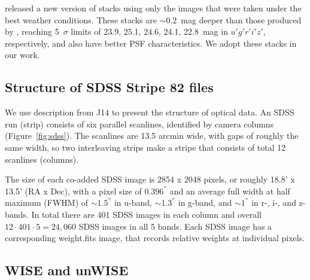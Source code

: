 \documentclass[apj,iop]{emulateapj}
\begin{document}
\citet[][hereafter J14]{Jiang2014} released a new version of stacks using only the images that were taken under the best weather conditions. These stacks are $\sim0.2$~mag deeper than those produced by \citet[][]{Annis2014}, reaching 5~$\sigma$ limits of 23.9, 25.1, 24.6, 24.1, 22.8~mag in $u' g' r' i' z'$, respectively, and also have better PSF characteristics. We adopt these stacks in our work.

\subsection{Structure of SDSS Stripe 82 files}

We use description from J14 to present the structure of optical data. An SDSS run (strip) consists of six parallel scanlines, identified by camera columns (Figure~\ref{fig:sdss}). The scanlines are 13.5 arcmin wide, with gaps of roughly the same width, so two interleaving strips make a stripe that consists of total 12 scanlines (columns). 


The size of each co-added SDSS image is 2854 x 2048 pixels, or roughly 18.8' x 13.5' (RA x Dec), with a pixel size of $0.396^{''}$ and an average full width at half maximum (FWHM) of $\sim1.5^{''}$ in u-band, $\sim1.3^{''}$ in g-band, and $\sim1^{''}$ in r-, i-, and z-bands. In total there are 401 SDSS images in each column and overall $12 \cdot 401 \cdot 5 = 24,060$ SDSS images in all 5 bands. Each SDSS image has a corresponding weight.fits image, that records relative weights at individual pixels.

\subsection{WISE and unWISE}

\end{document}
